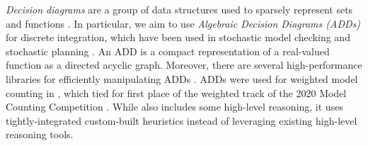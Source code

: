 \emph{Decision diagrams} are a group of data structures used to sparsely represent sets and functions \cite{akers1978binary,bahar1997algebraic,minato1993zero,sanner2005affine}. 
In particular, we aim to use \emph{Algebraic Decision Diagrams (ADDs)} \cite{bahar1997algebraic} for discrete integration, which have been used in stochastic model checking \cite{KNP07} and stochastic planning \cite{HSHB99}. 
An ADD is a compact representation of a real-valued function as a directed acyclic graph. 
Moreover, there are several high-performance libraries for efficiently manipulating ADDs \cite{somenzi2015cudd,van2015sylvan}.
ADDs were used for weighted model counting in \addmc{} \cite{DPV20}, which tied for first place of the weighted track of the 2020 Model Counting Competition \cite{fichte2020model}.
While \addmc{} also includes some high-level reasoning, it uses tightly-integrated custom-built heuristics \cite{dechter99,bouquet99,tarjan1984simple,koster2001treewidth} instead of leveraging existing high-level reasoning tools.






